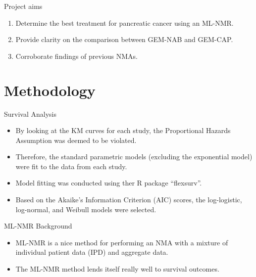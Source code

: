 \documentclass{beamer}
\begin{document}
\begin{frame}{Project aims}
    \begin{enumerate}
        \item Determine the best treatment for pancreatic cancer using an ML-NMR.
        \pause
        \item Provide clarity on the comparison between GEM-NAB and GEM-CAP.
        \pause
        \item Corroborate findings of previous NMAs.
    \end{enumerate} 
\end{frame} 

\section{Methodology}

\begin{frame}{Survival Analysis}
    \begin{itemize}
        \item By looking at the KM curves for each study, the Proportional Hazards Assumption was deemed to be violated.
        \pause
        \item Therefore, the standard parametric models (excluding the exponential model) were fit to the data from each study.
        \pause
        \item Model fitting was conducted using ther R package ``flexsurv''.
        \pause
        \item Based on the Akaike's Information Criterion (AIC) scores, the log-logistic, log-normal, and Weibull models were selected. 
    \end{itemize}   
\end{frame} 

\begin{frame}{ML-NMR Background}
    \begin{itemize}
        \item ML-NMR is a nice method for performing an NMA with a mixture of individual patient data (IPD) and aggregate data. 
        \pause
        \item The ML-NMR method lends itself really well to survival outcomes.
    \end{itemize}
\end{frame}
\end{document}
